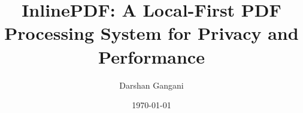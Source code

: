 \documentclass[12pt,a4paper]{article}
\title{\textbf{InlinePDF: A Local-First PDF Processing System for Privacy and Performance}}
\author{Darshan Gangani}
\date{\today}
\begin{document}
\maketitle
\thispagestyle{empty}

\begin{abstract}
  
\end{abstract}

\newpage

\pagestyle{empty}
\tableofcontents
\clearpage
\pagestyle{fancy}


\clearpage

\clearpage

\clearpage

\clearpage

\clearpage

\clearpage

\clearpage

\clearpage

\clearpage

\end{document}
